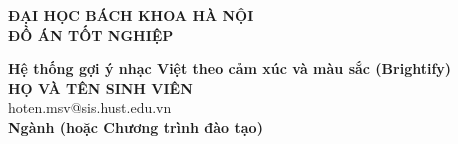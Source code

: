 \documentclass[DoAn.tex]{subfiles}
\begin{document}
\begin{titlepage}
\thispagestyle{empty}
\begin{center}

{\textbf{\large{ĐẠI HỌC BÁCH KHOA HÀ NỘI}}}\\[4cm]

{\textbf{\huge{ ĐỒ ÁN TỐT NGHIỆP}}}\\[1cm]
{\textbf{\Large{Hệ thống gợi ý nhạc Việt theo cảm xúc và màu sắc (Brightify)}}\\[1cm]

{\textbf{\large{HỌ VÀ TÊN SINH VIÊN}}}\\
{\large{hoten.msv@sis.hust.edu.vn}}\\[0.5cm]

{\textbf{\large{Ngành (hoặc Chương trình đào tạo)}}}\\

\vspace{4cm}
\begin{table}[H]
\centering
{}
\end{table}}
\end{center}

\end{titlepage}
\end{document}
